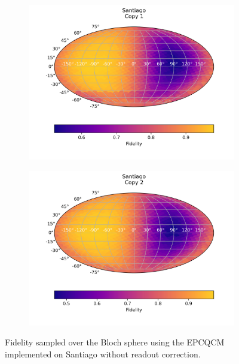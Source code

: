   \begin{figure}[H]
    \centering
    \begin{subfigure}{.5\textwidth}
      \centering
      \includegraphics[width=\textwidth]{Figures/Economical/IBM/FullSphere/results_santiago_copy1.png}
      
      \label{fig:epc_uncorrected_santiago_sphere_1}
    \end{subfigure}%
    \begin{subfigure}{.5\textwidth}
      \centering
      \includegraphics[width=\textwidth]{Figures/Economical/IBM/FullSphere/results_santiago_copy2.png}
      
      \label{fig:epc_uncorrected_santiago_sphere_2}
    \end{subfigure}
    \caption{Fidelity sampled over the Bloch sphere using the EPCQCM implemented on Santiago without readout correction.}
    \label{fig:epc_uncorrected_santiago_sphere}
  \end{figure}
  
